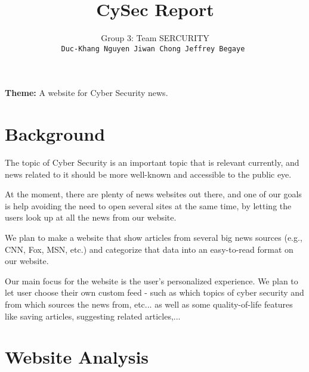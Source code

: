 \documentclass{article}
\title{CySec Report}
\author{
Group 3: Team SERCURITY\\
\texttt{Duc-Khang Nguyen \hspace{0.3in} Jiwan Chong \hspace{0.3in} Jeffrey Begaye }
}
\begin{document}
\maketitle

\textbf{Theme:} A website for Cyber Security news.

\section{Background}

The topic of Cyber Security is an important topic that is relevant currently, and news related to it should be more well-known and accessible to the public eye.

At the moment, there are plenty of news websites out there, and one of our goals is help avoiding the need to open several sites at the same time, by letting the users look up at all the news from our website. 

We plan to make a website that show articles from several big news sources (e.g., CNN, Fox, MSN, etc.) and categorize that data into an easy-to-read format on our website. 

Our main focus for the website is the user's personalized experience. We plan to let user choose their own custom feed - such as which topics of cyber security and from which sources the news from, etc... as well as some quality-of-life features like saving articles, suggesting related articles,...


\section{Website Analysis}
\end{document}
